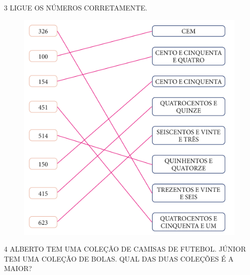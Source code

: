 \pagebreak
\num{3} LIGUE OS NÚMEROS CORRETAMENTE.

\begin{figure}[htpb!]
\includegraphics[width=\textwidth]{../ilustracoes/MAT1/SAEB_1ANO_MAT_FIGURA4.png}
\end{figure}

\pagebreak
\num{4} ALBERTO TEM UMA COLEÇÃO DE CAMISAS DE FUTEBOL. JÚNIOR TEM UMA COLEÇÃO DE BOLAS. QUAL DAS DUAS COLEÇÕES É A MAIOR?


